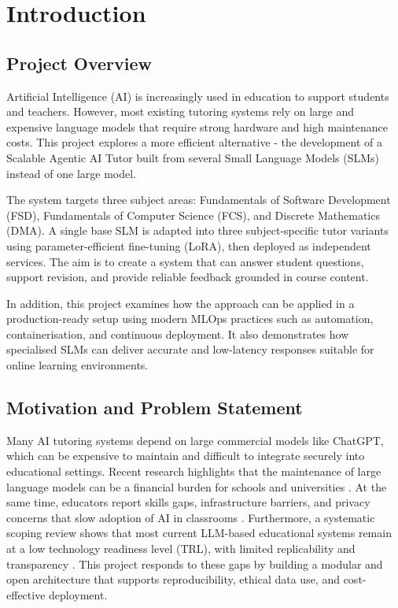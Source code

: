 \chapter{Introduction}

\section{Project Overview}
Artificial Intelligence (AI) is increasingly used in education to support students and teachers. However, most existing tutoring systems rely on large and expensive language models that require strong hardware and high maintenance costs. This project explores a more efficient alternative - the development of a Scalable Agentic AI Tutor built from several Small Language Models (SLMs) instead of one large model.

The system targets three subject areas: Fundamentals of Software Development (FSD), Fundamentals of Computer Science (FCS), and Discrete Mathematics (DMA). A single base SLM is adapted into three subject-specific tutor variants using parameter-efficient fine-tuning (LoRA), then deployed as independent services. The aim is to create a system that can answer student questions, support revision, and provide reliable feedback grounded in course content.

In addition, this project examines how the approach can be applied in a production-ready setup using modern MLOps practices such as automation, containerisation, and continuous deployment. It also demonstrates how specialised SLMs can deliver accurate and low-latency responses suitable for online learning environments.

\section{Motivation and Problem Statement}
Many AI tutoring systems depend on large commercial models like ChatGPT, which can be expensive to maintain and difficult to integrate securely into educational settings. Recent research highlights that the maintenance of large language models can be a financial burden for schools and universities \parencite{ChatGPTf63:online}. At the same time, educators report skills gaps, infrastructure barriers, and privacy concerns that slow adoption of AI in classrooms \parencite{Untitled13:online}. Furthermore, a systematic scoping review shows that most current LLM-based educational systems remain at a low technology readiness level (TRL), with limited replicability and transparency \parencite{Practica79:online}. This project responds to these gaps by building a modular and open architecture that supports reproducibility, ethical data use, and cost-effective deployment.


